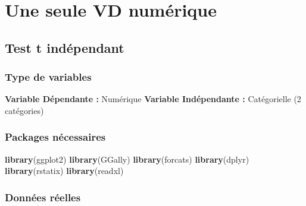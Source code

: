 \documentclass[
]{book}
\newenvironment{Shaded}{\begin{snugshade}}{\end{snugshade}}
\newcommand{\KeywordTok}[1]{\textcolor[rgb]{0.13,0.29,0.53}{\textbf{#1}}}
\newcommand{\NormalTok}[1]{#1}
\begin{document}
\hypertarget{une-seule-vd-numuxe9rique}{%
\section{Une seule VD numérique}\label{une-seule-vd-numuxe9rique}}

\hypertarget{test-t-induxe9pendant}{%
\subsection{Test t indépendant}\label{test-t-induxe9pendant}}

\hypertarget{type-de-variables}{%
\subsubsection{Type de variables}\label{type-de-variables}}

\textbf{Variable Dépendante :} Numérique
\textbf{Variable Indépendante :} Catégorielle (2 catégories)

\hypertarget{packages-nuxe9cessaires}{%
\subsubsection{Packages nécessaires}\label{packages-nuxe9cessaires}}

\begin{Shaded}
\begin{Highlighting}[]
\KeywordTok{library}\NormalTok{(ggplot2)}
\KeywordTok{library}\NormalTok{(GGally)}
\KeywordTok{library}\NormalTok{(forcats)}
\KeywordTok{library}\NormalTok{(dplyr)}
\KeywordTok{library}\NormalTok{(rstatix)}
\KeywordTok{library}\NormalTok{(readxl)}
\end{Highlighting}
\end{Shaded}

\hypertarget{donnuxe9es-ruxe9elles}{%
\subsubsection{Données réelles}\label{donnuxe9es-ruxe9elles}}
\end{document}
